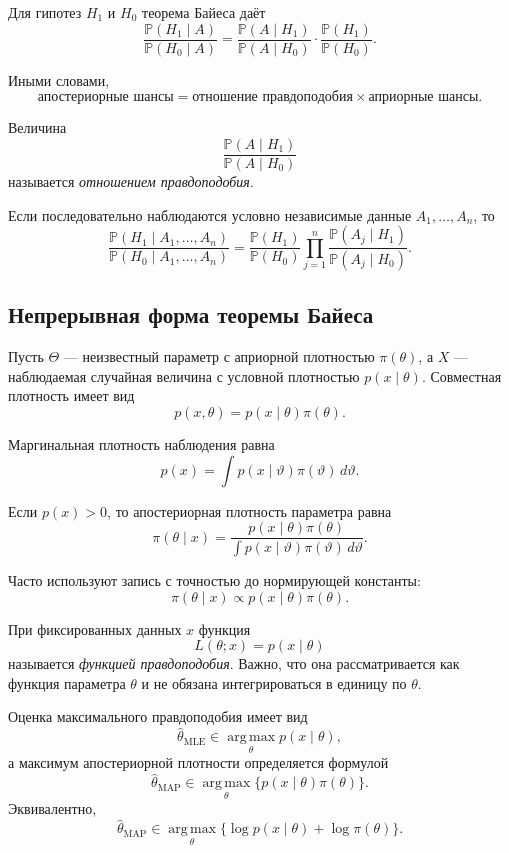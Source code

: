 \documentclass[12pt,a4paper]{article}
\theoremstyle{plain}
\theoremstyle{definition}
\theoremstyle{remark}
\newcommand{\Pp}{\mathbb{P}}
\newcommand{\argmax}{\operatorname*{arg\,max}}
\begin{document}
Для гипотез $H_1$ и $H_0$ теорема Байеса даёт
\[
    \frac{\Pp(H_1\mid A)}{\Pp(H_0\mid A)}
    =
    \frac{\Pp(A\mid H_1)}{\Pp(A\mid H_0)}
    \cdot
    \frac{\Pp(H_1)}{\Pp(H_0)}.
\]

Иными словами,
\[
    \boxed{
    \text{апостериорные шансы}
    =
    \text{отношение правдоподобия}
    \times
    \text{априорные шансы}
    }.
\]

Величина
\[
    \frac{\Pp(A\mid H_1)}{\Pp(A\mid H_0)}
\]
называется \emph{отношением правдоподобия}.

Если последовательно наблюдаются условно независимые данные
$A_1,\ldots,A_n$, то
\[
    \frac{\Pp(H_1\mid A_1,\ldots,A_n)}
         {\Pp(H_0\mid A_1,\ldots,A_n)}
    =
    \frac{\Pp(H_1)}{\Pp(H_0)}
    \prod_{j=1}^{n}
    \frac{\Pp(A_j\mid H_1)}{\Pp(A_j\mid H_0)}.
\]

\subsection{Непрерывная форма теоремы Байеса}

Пусть $\Theta$ --- неизвестный параметр с априорной плотностью
$\pi(\theta)$, а $X$ --- наблюдаемая случайная величина с условной
плотностью $p(x\mid\theta)$. Совместная плотность имеет вид
\[
    p(x,\theta)
    =
    p(x\mid\theta)\pi(\theta).
\]

Маргинальная плотность наблюдения равна
\[
    p(x)
    =
    \int p(x\mid\vartheta)\pi(\vartheta)\,d\vartheta.
\]

Если $p(x)>0$, то апостериорная плотность параметра равна
\[
    \boxed{
    \pi(\theta\mid x)
    =
    \frac{
        p(x\mid\theta)\pi(\theta)
    }{
        \displaystyle
        \int p(x\mid\vartheta)\pi(\vartheta)\,d\vartheta
    }
    }.
\]

Часто используют запись с точностью до нормирующей константы:
\[
    \pi(\theta\mid x)
    \propto
    p(x\mid\theta)\pi(\theta).
\]

При фиксированных данных $x$ функция
\[
    L(\theta;x)=p(x\mid\theta)
\]
называется \emph{функцией правдоподобия}. Важно, что она рассматривается
как функция параметра $\theta$ и не обязана интегрироваться в единицу по
$\theta$.

Оценка максимального правдоподобия имеет вид
\[
    \widehat{\theta}_{\mathrm{MLE}}
    \in
    \argmax_{\theta}p(x\mid\theta),
\]
а максимум апостериорной плотности определяется формулой
\[
    \widehat{\theta}_{\mathrm{MAP}}
    \in
    \argmax_{\theta}
    \bigl\{
        p(x\mid\theta)\pi(\theta)
    \bigr\}.
\]
Эквивалентно,
\[
    \widehat{\theta}_{\mathrm{MAP}}
    \in
    \argmax_{\theta}
    \bigl\{
        \log p(x\mid\theta)+\log\pi(\theta)
    \bigr\}.
\]
\end{document}
